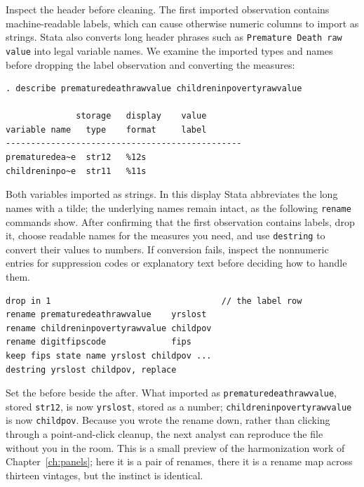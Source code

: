 \documentclass[
    a4paper,
    fontsize=10pt,
    twoside=true,
    numbers=noenddot,
]{kaobook}
\begin{document}
Inspect the header before cleaning. The first imported observation contains machine-readable labels, which can cause otherwise numeric columns to import as strings. Stata also converts long header phrases such as \texttt{Premature Death raw value} into legal variable names. We examine the imported types and names before dropping the label observation and converting the measures:
\par
{\footnotesize
\begin{verbatim}
. describe prematuredeathrawvalue childreninpovertyrawvalue

              storage   display    value
variable name   type    format     label
-----------------------------------------------
prematuredea~e  str12   %12s
childreninpo~e  str11   %11s
\end{verbatim}
}
Both variables imported as strings. In this display Stata abbreviates the long names with a tilde; the underlying names remain intact, as the following \texttt{rename} commands show. After confirming that the first observation contains labels, drop it, choose readable names for the measures you need, and use \texttt{destring} to convert their values to numbers. If conversion fails, inspect the nonnumeric entries for suppression codes or explanatory text before deciding how to handle them.
\par
{\footnotesize
\begin{verbatim}
drop in 1                                  // the label row
rename prematuredeathrawvalue    yrslost
rename childreninpovertyrawvalue childpov
rename digitfipscode             fips
keep fips state name yrslost childpov ...
destring yrslost childpov, replace
\end{verbatim}
}
Set the before beside the after. What imported as \texttt{premature\allowbreak death\allowbreak raw\allowbreak value}, stored \texttt{str12}, is now \texttt{yrslost}, stored as a number; \texttt{childrenin\allowbreak poverty\allowbreak raw\allowbreak value} is now \texttt{childpov}. Because you wrote the rename down, rather than clicking through a point-and-click cleanup, the next analyst can reproduce the file without you in the room. This is a small preview of the harmonization work of Chapter~\ref{ch:panels}; here it is a pair of renames, there it is a rename map across thirteen vintages, but the instinct is identical.
\end{document}
